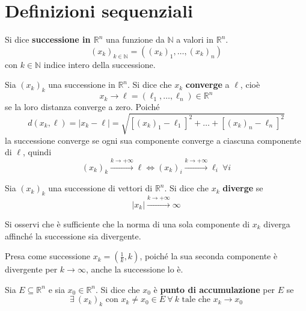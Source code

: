 \section{Definizioni sequenziali}
\begin{definition}
    Si dice \textbf{successione in $\mathbb{R}^n$} una funzione da $\mathbb{N}$ a valori in $\mathbb{R}^n$.
    \begin{equation*}
        (x_k)_{k \in \mathbb{N}} = ((x_k)_1, \dots, (x_k)_n)  
    \end{equation*}
    con $k \in \mathbb{N}$ indice intero della successione.
\end{definition}
\begin{definition}
    Sia $(x_k)_k$ una successione in $\mathbb{R}^n$. Si dice che $x_k$ \textbf{converge} a $\ell$, cioè
    \begin{equation*}
        x_k \to \ell=(\ell_1, \dots, \ell_n) \in \mathbb{R}^n
    \end{equation*}
    se la loro distanza converge a zero. Poiché 
    \begin{equation*}
        d(x_k, \ell)=|x_k-\ell|=\sqrt{[(x_k)_1-\ell_1]^2+\dots+[(x_k)_n-\ell_n]^2}
    \end{equation*}
    la successione converge se ogni sua componente converge a ciascuna componente di $\ell$, quindi
    \begin{equation*}
        (x_k)_k \xrightarrow{k\to+\infty} \ell \iff (x_k)_i \xrightarrow{k\to+\infty} \ell_i \ \forall i
    \end{equation*}
\end{definition}
\begin{definition}
    Sia $(x_k)_k$ una successione di vettori di $\mathbb{R}^n$. Si dice che $x_k$ \textbf{diverge} se
    \begin{equation*}
        |x_k| \xrightarrow{k\to+\infty} \infty
    \end{equation*}
    \end{definition}
    \begin{oss}
        Si osservi che è sufficiente che la norma di una sola componente di $x_k$ diverga affinché la successione sia divergente.
        \begin{example}
            Presa come successione $x_k=\left(\frac{1}{k}, k\right)$, poiché la sua seconda componente è divergente per $k \to \infty$, anche la successione lo è.
        \end{example}
    \end{oss}
\begin{definition} \label{Def: Punto di accumulazione}
    Sia $E \subseteq \mathbb{R}^n$ e sia $x_0 \in \mathbb{R}^n$. Si dice che $x_0$ è \textbf{punto di accumulazione} per $E$ se
    \begin{equation*}
        \exists\ (x_k)_k \text{ con } x_k\neq x_0 \in E \ \forall \ k \text{ tale che } x_k \to x_0
    \end{equation*}
\end{definition}
